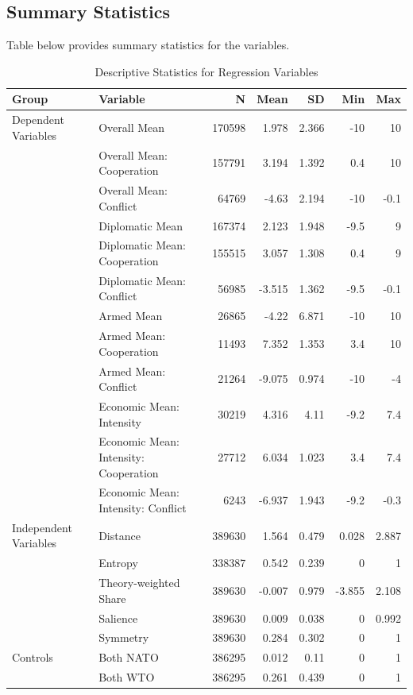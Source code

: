 \documentclass[12pt]{article}
\begin{document}
\subsection{Summary Statistics}
Table below provides summary statistics for the variables.
\begin{table}[htbp]
\scriptsize
\centering
\caption{Descriptive Statistics for Regression Variables}
\renewcommand{\arraystretch}{1.2}
\begin{tabularx}{\textwidth}{lXrrrrr}
\toprule
\rowcolor{gray!20}
Group & Variable & \textbf{N} & \textbf{Mean} & \textbf{SD} & \textbf{Min} & \textbf{Max} \\
\midrule
Dependent Variables
 & Overall Mean & 170598 & 1.978 & 2.366 & -10 & 10 \\
 & Overall Mean: Cooperation & 157791 & 3.194 & 1.392 & 0.4 & 10 \\
 & Overall Mean: Conflict & 64769 & -4.63 & 2.194 & -10 & -0.1 \\
 & Diplomatic Mean & 167374 & 2.123 & 1.948 & -9.5 & 9 \\
 & Diplomatic Mean: Cooperation & 155515 & 3.057 & 1.308 & 0.4 & 9 \\
 & Diplomatic Mean: Conflict & 56985 & -3.515 & 1.362 & -9.5 & -0.1 \\
 & Armed Mean & 26865 & -4.22 & 6.871 & -10 & 10 \\
 & Armed Mean: Cooperation & 11493 & 7.352 & 1.353 & 3.4 & 10 \\
 & Armed Mean: Conflict & 21264 & -9.075 & 0.974 & -10 & -4 \\
 & Economic Mean: Intensity & 30219 & 4.316 & 4.11 & -9.2 & 7.4 \\
 & Economic Mean: Intensity: Cooperation & 27712 & 6.034 & 1.023 & 3.4 & 7.4 \\
 & Economic Mean: Intensity: Conflict & 6243 & -6.937 & 1.943 & -9.2 & -0.3 \\
Independent Variables
 & Distance & 389630 & 1.564 & 0.479 & 0.028 & 2.887 \\
 & Entropy & 338387 & 0.542 & 0.239 & 0 & 1 \\
 & Theory-weighted Share & 389630 & -0.007 & 0.979 & -3.855 & 2.108 \\
 & Salience & 389630 & 0.009 & 0.038 & 0 & 0.992 \\
 & Symmetry & 389630 & 0.284 & 0.302 & 0 & 1 \\
Controls
 & Both NATO & 386295 & 0.012 & 0.11 & 0 & 1 \\
 & Both WTO & 386295 & 0.261 & 0.439 & 0 & 1 \\

\end{tabularx}
\end{table}
\end{document}
